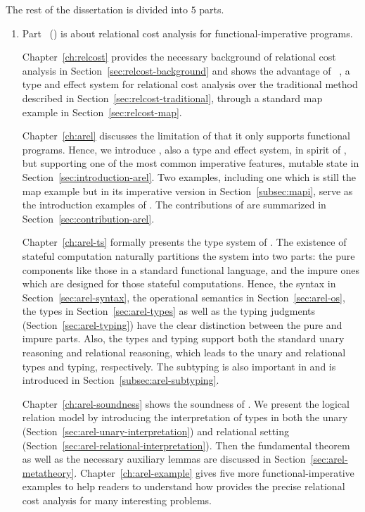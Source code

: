 The rest of the dissertation is divided into $5$ parts. 
\begin{enumerate}
    \item Part ~({\Arel}) is about relational cost analysis for functional-imperative programs.
    
    Chapter~\ref{ch:relcost} provides the necessary background of relational cost analysis in Section~\ref{sec:relcost-background} and shows the advantage of {\Relcost}~\citet{Cicek17}, a type and effect system for relational cost analysis over the traditional method described in Section~\ref{sec:relcost-traditional}, through a standard map example in Section~\ref{sec:relcost-map}. 
    
    Chapter~\ref{ch:arel} discusses the limitation of {\Relcost} that it only supports functional programs. Hence, we introduce {\Arel}, also a type and effect system, in spirit of {\Relcost}, but supporting one of the most common imperative features, mutable state in Section~\ref{sec:introduction-arel}. Two examples, including one which is still the map example but in its imperative version in Section~\ref{subsec:mapi}, serve as the introduction examples of {\Arel}. The contributions of {\Arel} are summarized in Section~\ref{sec:contribution-arel}.
    
    Chapter~\ref{ch:arel-ts} formally presents the type system of {\Arel}. The existence of stateful computation naturally partitions the system into two parts: the pure components like those in a standard functional language, and the impure ones which are designed for those stateful computations. Hence, the syntax in Section~\ref{sec:arel-syntax}, the operational semantics in Section~\ref{sec:arel-os}, the types in Section~\ref{sec:arel-types} as well as the typing judgments (Section~\ref{sec:arel-typing}) have the clear distinction between the pure and impure parts. Also, the types and typing support both the standard unary reasoning and relational reasoning, which leads to the unary and relational types and typing, respectively. The subtyping is also important in {\Arel} and is introduced in Section~\ref{subsec:arel-subtyping}. 
    
    Chapter~\ref{ch:arel-soundness} shows the soundness of {\Arel}. We present the logical relation model by introducing the interpretation of types in both the unary (Section~\ref{sec:arel-unary-interpretation}) and relational setting (Section~\ref{sec:arel-relational-interpretation}). Then the fundamental theorem as well as the necessary auxiliary lemmas are discussed in Section~\ref{sec:arel-metatheory}. 
    Chapter~\ref{ch:arel-example} gives five more functional-imperative examples to help readers to understand how {\Arel} provides the precise relational cost analysis for many interesting problems.
    

\end{enumerate}
